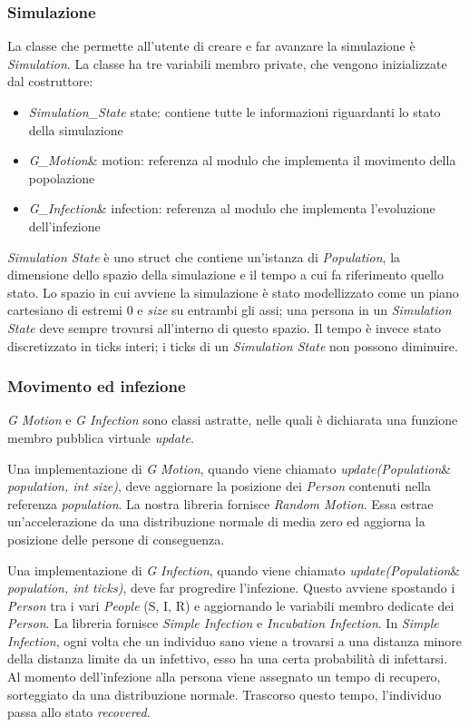 \documentclass[a4paper,10pt,twocolumn]{article}
\begin{document}
\subsubsection*{Simulazione}
La classe che permette all’utente di creare e far avanzare la simulazione è \emph{Simulation}. La classe ha tre variabili membro private, che vengono inizializzate dal costruttore:
\begin{itemize}
    \item \emph{Simulation\_State} state: contiene tutte le informazioni riguardanti lo stato della simulazione
    \item \emph{G\_Motion}\& motion: referenza al modulo che implementa il movimento della popolazione
    \item \emph{G\_Infection}\& infection: referenza al modulo che implementa l’evoluzione dell’infezione
\end{itemize}

\emph{Simulation State} è uno struct che contiene un’istanza di \emph{Population}, la dimensione dello spazio della simulazione e il tempo a cui fa riferimento quello stato. Lo spazio in cui avviene la simulazione è stato modellizzato come un piano cartesiano di estremi 0 e \emph{size} su entrambi gli assi; una persona in un \emph{Simulation State} deve sempre trovarsi all’interno di questo spazio. Il tempo è invece stato discretizzato in ticks interi; i ticks di un \emph{Simulation State} non possono diminuire.

\subsubsection*{Movimento ed infezione}
\emph{G Motion} e \emph{G Infection} sono classi astratte, nelle quali è dichiarata una funzione membro pubblica virtuale \emph{update}.

Una implementazione di \emph{G Motion}, quando viene chiamato \emph{update(Population}\& \emph{population, int size)}, deve aggiornare la posizione dei \emph{Person} contenuti nella referenza \emph{population}. La nostra libreria fornisce \emph{Random Motion}. Essa estrae un'accelerazione da una distribuzione normale di media zero ed aggiorna la posizione delle persone di conseguenza.

Una implementazione di \emph{G Infection}, quando viene chiamato \emph{update(Population}\& \emph{population, int ticks)}, deve far progredire l’infezione. Questo avviene spostando i \emph{Person} tra i vari \emph{People} (S, I, R) e aggiornando le variabili membro dedicate dei \emph{Person}. La libreria fornisce \emph{Simple Infection} e \emph{Incubation Infection}. In \emph{Simple Infection}, ogni volta che un individuo sano viene a trovarsi a una distanza minore della distanza limite da un infettivo, esso ha una certa probabilità di infettarsi. Al momento dell'infezione alla persona viene assegnato un tempo di recupero, sorteggiato da una distribuzione normale. Trascorso questo tempo, l'individuo passa allo stato \emph{recovered}.
\end{document}
